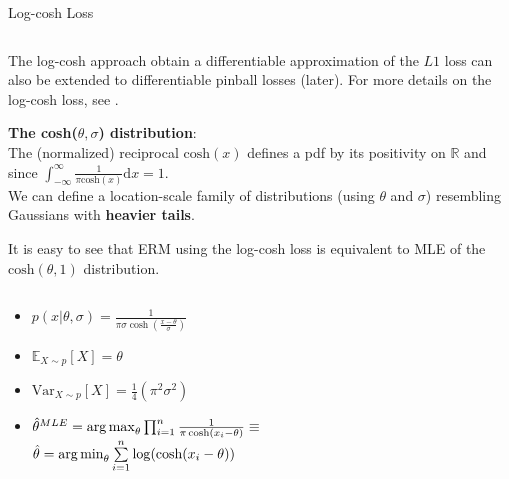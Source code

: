 \documentclass[11pt,compress,t,notes=noshow, xcolor=table]{beamer}
\begin{document}
\begin{vbframe}{Log-cosh Loss}
\begin{columns}
\end{columns}

The log-cosh approach obtain a differentiable approximation of the $L1$ loss can also be extended to  differentiable pinball losses (later). For more details on the log-cosh loss, see  .

\framebreak

\textbf{The cosh($\theta,\sigma$) distribution}:\\
The (normalized) reciprocal $\text{cosh}(x)$ defines a pdf by its positivity on $\mathbb{R}$ and since $\int_{-\infty}^{\infty} \frac{1}{\pi \text{cosh}(x)} \text{d}x = 1$.\\
\vspace{0.1cm}
We can define a location-scale family of distributions (using $\theta$ and $\sigma$) resembling Gaussians with \textbf{heavier tails}. 

It is easy to see that ERM using the log-cosh loss is equivalent to MLE of the $\text{cosh}(\theta,1)$ distribution.

\begin{columns}

\begin{column}{0.5\textwidth}

{\normalsize 
\begin{itemize}\setlength{\itemsep}{0.32em}
    \item $p(x | \theta, \sigma)=\frac{1}{\pi \sigma \cosh \left(\frac{x-\theta}{\sigma}\right)}$
    \item $\mathbb{E}_{X\sim p}[X]=\theta$
    \item $\text{Var}_{X \sim p}[X]=\frac{1}{4}(\pi^2 \sigma^2)$
    \item {\footnotesize $\hat{\theta}^{MLE}=\operatorname*{arg\,max}_{\theta} \prod_{i=1}^n \frac{1}{\pi \cosh \left(x_i-\theta\right)} \equiv$}\\{\footnotesize $\hat{\theta} = \operatorname*{arg\,min}_{\theta}\sum\limits_{i=1}^n \log(\text{cosh}(x_i-\theta))$}
\end{itemize}
}
\end{column}

\begin{column}{0.7\textwidth}


\end{column}
\end{columns}
\end{vbframe}
\end{document}
